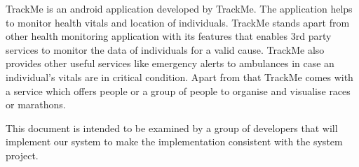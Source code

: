 TrackMe is an android application developed by TrackMe. The application helps to monitor health vitals and location of individuals. TrackMe stands apart from other health monitoring application with its features that enables 3rd party services to monitor the data of individuals for a valid cause. TrackMe also provides other useful services like emergency alerts to ambulances in case an individual's vitals are in critical condition. Apart from that TrackMe comes with a service which offers people or a group of people to organise and visualise races or marathons. 

This document is intended to be examined by a group of developers that will implement our system to make the implementation consistent with the system project.

